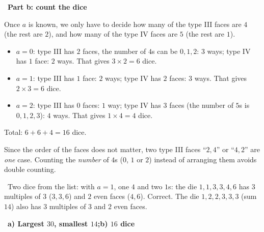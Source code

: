 \documentclass[11pt]{article}
\providecommand{\AnsWord}{Đáp số}
\newcommand{\ans}[1]{\par\smallskip{\bfseries\color{tmGreen!88!black}\AnsWord:}\ {\bfseries\color{AnsRed}#1}\par}
\newcommand{\step}[2]{\par\smallskip\noindent{\bfseries\color{tmBlue!85!black}\StepWord~#1.}\ {\bfseries #2}\par\nopagebreak}
\newcommand{\verify}[1]{\par\smallskip\noindent{\bfseries\color{tmGreen!80!black}\faCheckCircle\ \CheckWord}\ #1\par}
\def\AnsWord{Answer}
\def\StepWord{Step}
\def\CheckWord{Check:}
\begin{document}
{\step{3}{Part b: count the dice}
Once $a$ is known, we only have to decide how many of the type III faces are $4$ (the rest are $2$), and how many of the type IV faces are
$5$ (the rest are $1$).
\begin{itemize}[leftmargin=1.2em,itemsep=1pt,topsep=2pt]
\item $a=0$: type III has $2$ faces, the number of $4$s can be $0,1,2$: $3$ ways; type IV has $1$ face: $2$ ways. That gives $3\times2=6$ dice.
\item $a=1$: type III has $1$ face: $2$ ways; type IV has $2$ faces: $3$ ways. That gives $2\times3=6$ dice.
\item $a=2$: type III has $0$ faces: $1$ way; type IV has $3$ faces (the number of $5$s is $0,1,2,3$): $4$ ways. That gives $1\times4=4$ dice.
\end{itemize}
Total: $6+6+4=16$ dice.
\begin{warnbox}Since the order of the faces does not matter, two type III faces ``$2,4$'' or ``$4,2$'' are \emph{one} case. Counting the
\emph{number} of $4$s ($0$, $1$ or $2$) instead of arranging them avoids double counting.\end{warnbox}
\verify{Two dice from the list: with $a=1$, one $4$ and two $1$s: the die $1,1,3,3,4,6$ has $3$ multiples of $3$ ($3,3,6$) and $2$ even
faces ($4,6$). Correct. The die $1,2,2,3,3,3$ (sum $14$) also has $3$ multiples of $3$ and $2$ even faces.}
\ans{a) Largest $30$, smallest $14$;\quad b) $16$ dice}
}
\end{document}
